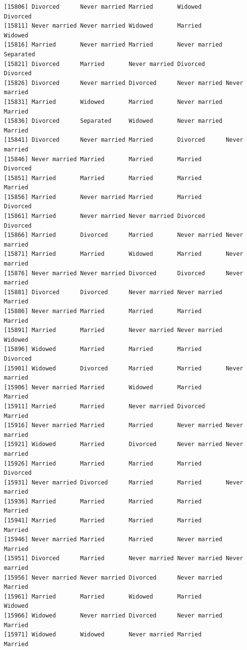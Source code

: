 \documentclass[
  letterpaper,
  DIV=11,
  numbers=noendperiod,
  oneside]{scrartcl}
\begin{document}
\begin{verbatim}
[15806] Divorced      Never married Married       Widowed       Divorced     
[15811] Never married Never married Widowed       Married       Widowed      
[15816] Married       Never married Married       Never married Separated    
[15821] Divorced      Married       Never married Divorced      Divorced     
[15826] Divorced      Never married Divorced      Never married Never married
[15831] Married       Widowed       Married       Never married Married      
[15836] Divorced      Separated     Widowed       Never married Married      
[15841] Divorced      Never married Married       Divorced      Never married
[15846] Never married Married       Married       Married       Divorced     
[15851] Married       Married       Married       Married       Married      
[15856] Married       Never married Married       Married       Divorced     
[15861] Married       Never married Never married Divorced      Divorced     
[15866] Married       Divorced      Married       Never married Never married
[15871] Married       Married       Widowed       Married       Never married
[15876] Never married Never married Divorced      Divorced      Never married
[15881] Divorced      Divorced      Never married Never married Married      
[15886] Never married Married       Married       Married       Married      
[15891] Married       Married       Never married Never married Widowed      
[15896] Widowed       Married       Married       Married       Divorced     
[15901] Widowed       Divorced      Married       Married       Never married
[15906] Never married Married       Widowed       Married       Married      
[15911] Married       Married       Never married Divorced      Married      
[15916] Never married Married       Married       Never married Never married
[15921] Widowed       Married       Divorced      Never married Never married
[15926] Married       Married       Married       Married       Divorced     
[15931] Never married Divorced      Married       Married       Never married
[15936] Married       Married       Married       Married       Married      
[15941] Married       Married       Married       Married       Married      
[15946] Never married Married       Married       Never married Married      
[15951] Divorced      Married       Never married Never married Never married
[15956] Never married Never married Divorced      Never married Married      
[15961] Married       Married       Widowed       Married       Widowed      
[15966] Widowed       Never married Divorced      Never married Married      
[15971] Widowed       Widowed       Never married Married       Married      

\end{verbatim}
\end{document}
